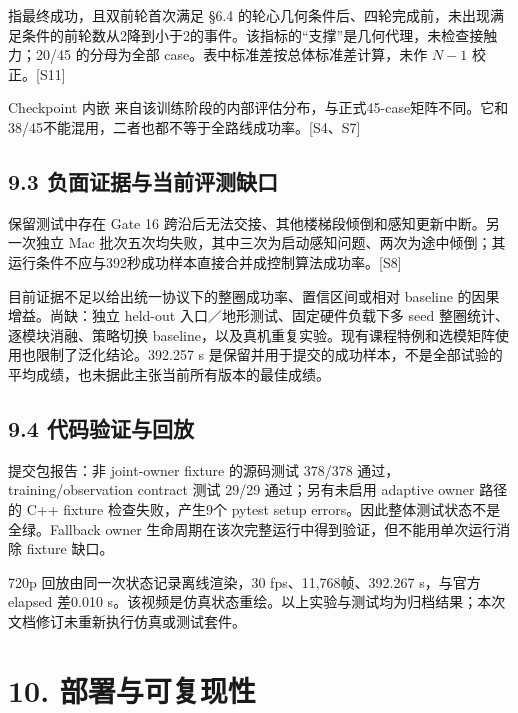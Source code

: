 \documentclass[
  10pt,
  a4paper,
]{article}
\begin{document}
{\ttfamily\small{}}
指最终成功，且双前轮首次满足 §6.4
的轮心几何条件后、四轮完成前，未出现满足条件的前轮数从2降到小于2的事件。该指标的``支撑''是几何代理，未检查接触力；20/45
的分母为全部 case。表中标准差按总体标准差计算，未作 \(N-1\)
校正。{[}S11{]}

Checkpoint 内嵌 {\ttfamily\small{}}
来自该训练阶段的内部评估分布，与正式45-case矩阵不同。它和38/45不能混用，二者也都不等于全路线成功率。{[}S4、S7{]}

\subsection{9.3
负面证据与当前评测缺口}\label{ux8d1fux9762ux8bc1ux636eux4e0eux5f53ux524dux8bc4ux6d4bux7f3aux53e3}

保留测试中存在 Gate 16
跨沿后无法交接、其他楼梯段倾倒和感知更新中断。另一次独立 Mac
批次五次均失败，其中三次为启动感知问题、两次为途中倾倒；其运行条件不应与392秒成功样本直接合并成控制算法成功率。{[}S8{]}

目前证据不足以给出统一协议下的整圈成功率、置信区间或相对 baseline
的因果增益。尚缺：独立 held-out 入口／地形测试、固定硬件负载下多 seed
整圈统计、逐模块消融、策略切换
baseline，以及真机重复实验。现有课程特例和选模矩阵使用也限制了泛化结论。392.257
s
是保留并用于提交的成功样本，不是全部试验的平均成绩，也未据此主张当前所有版本的最佳成绩。

\subsection{9.4
代码验证与回放}\label{ux4ee3ux7801ux9a8cux8bc1ux4e0eux56deux653e}

提交包报告：非 joint-owner fixture 的源码测试 378/378
通过，training/observation contract 测试 29/29 通过；另有未启用 adaptive
owner 路径的 C++ fixture 检查失败，产生9个 pytest setup
errors。因此整体测试状态不是全绿。Fallback owner
生命周期在该次完整运行中得到验证，但不能用单次运行消除 fixture 缺口。

720p 回放由同一次状态记录离线渲染，30 fps、11,768帧、392.267 s，与官方
elapsed 差0.010
s。该视频是仿真状态重绘。以上实验与测试均为归档结果；本次文档修订未重新执行仿真或测试套件。

\Needspace{240pt}

\section{10.
部署与可复现性}\label{ux90e8ux7f72ux4e0eux53efux590dux73b0ux6027}
\end{document}
